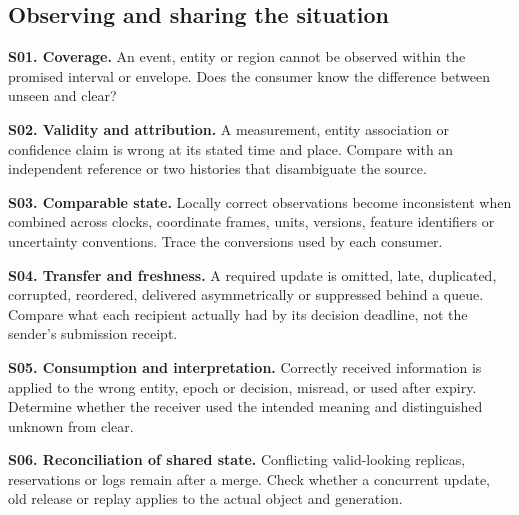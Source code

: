 \documentclass[11pt]{article}
\newcommand{\entry}[3]{\par\smallskip\noindent\textbf{#1. #2.} #3\par}
\begin{document}
\subsection{Observing and sharing the situation}
\entry{S01}{Coverage}{An event, entity or region cannot be observed within the promised interval or envelope. Does the consumer know the difference between unseen and clear?}
\entry{S02}{Validity and attribution}{A measurement, entity association or confidence claim is wrong at its stated time and place. Compare with an independent reference or two histories that disambiguate the source.}
\entry{S03}{Comparable state}{Locally correct observations become inconsistent when combined across clocks, coordinate frames, units, versions, feature identifiers or uncertainty conventions. Trace the conversions used by each consumer.}
\entry{S04}{Transfer and freshness}{A required update is omitted, late, duplicated, corrupted, reordered, delivered asymmetrically or suppressed behind a queue. Compare what each recipient actually had by its decision deadline, not the sender's submission receipt.}
\entry{S05}{Consumption and interpretation}{Correctly received information is applied to the wrong entity, epoch or decision, misread, or used after expiry. Determine whether the receiver used the intended meaning and distinguished unknown from clear.}
\entry{S06}{Reconciliation of shared state}{Conflicting valid-looking replicas, reservations or logs remain after a merge. Check whether a concurrent update, old release or replay applies to the actual object and generation.}
\end{document}
